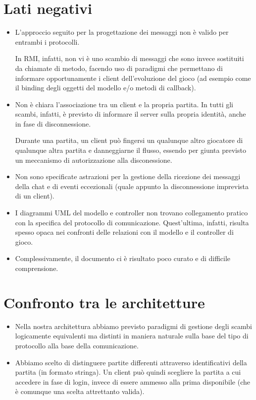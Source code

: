 \documentclass[a4paper,11pt]{article} %
\begin{document}
    \section{Lati negativi}\label{sec:lati-negativi}
    \begin{itemize}
        \item L'approccio seguito per la progettazione dei messaggi non è valido per
        entrambi i protocolli.

        In RMI, infatti, non vi è uno scambio di messaggi che sono invece sostituiti da chiamate
        di metodo, facendo uso di paradigmi che permettano di informare opportunamente i client
        dell'evoluzione del gioco (ad esempio come il binding degli oggetti del modello e/o metodi
        di callback).
        \item Non è chiara l'associazione tra un client e la propria partita. In tutti gli scambi,
        infatti, è previsto di informare il server sulla propria identità, anche in fase di disconnessione.

        Durante una partita, un client può fingersi un qualunque altro giocatore di qualunque
        altra partita e danneggiarne il flusso, essendo per giunta previsto un meccanismo di
        autorizzazione alla disconessione.
        \item Non sono specificate astrazioni per la gestione della ricezione dei messaggi
        della chat e di eventi eccezionali (quale appunto la disconnessione imprevista di un client).
        \item I diagrammi UML del modello e controller non trovano collegamento pratico con la specifica
        del protocollo di comunicazione.
        Quest'ultima, infatti, risulta spesso opaca nei confronti delle relazioni con il modello
        e il controller di gioco.
        \item Complessivamente, il documento ci è risultato poco curato e di difficile comprensione.
    \end{itemize}


    \section{Confronto tra le architetture}\label{sec:confronto-tra-le-architetture}
    \begin{itemize}
        \item Nella nostra architettura abbiamo previsto paradigmi di gestione degli scambi
        logicamente equivalenti ma distinti in maniera naturale sulla base del tipo di protocollo
        alla base della comunicazione.
        \item Abbiamo scelto di distinguere partite differenti attraverso identificativi della
        partita (in formato stringa).
        Un client può quindi scegliere la partita a cui accedere in fase di login, invece di essere
        ammesso alla prima disponibile (che è comunque una scelta attrettanto valida).
    \end{itemize}
\end{document}
